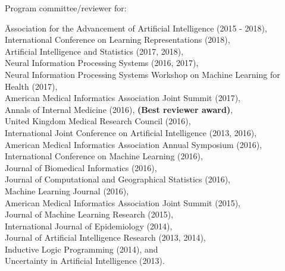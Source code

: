 Program committee/reviewer for: \vspace*{-0.5em}
\begin{tabbing}
\hspace*{2em}\= Association for the Advancement of Artificial Intelligence (2015 - 2018),\\
\> International Conference on Learning Representations (2018),\\
\> Artificial Intelligence and Statistics (2017, 2018),\\
\> Neural Information Processing Systems (2016, 2017),\\
\> Neural Information Processing Systems Workshop on Machine Learning for Health (2017), \\
\> American Medical Informatics Association Joint Summit (2017),\\
\> Annals of Internal Medicine (2016), \textbf{(Best reviewer award)},\\
\> United Kingdom Medical Research Council (2016),\\
\> International Joint Conference on Artificial Intelligence (2013, 2016),\\
\> American Medical Informatics Association Annual Symposium (2016),\\
\> International Conference on Machine Learning (2016),\\
\> Journal of Biomedical Informatics (2016), \\
\> Journal of Computational and Geographical Statistics (2016),\\
\> Machine Learning Journal (2016),\\
\> American Medical Informatics Association Joint Summit (2015),\\
\> Journal of Machine Learning Research (2015),\\
\> International Journal of Epidemiology (2014),\\
\> Journal of Artificial Intelligence Research (2013, 2014),\\
\> Inductive Logic Programming (2014), and \\
\> Uncertainty in Artificial Intelligence (2013).
\end{tabbing}


